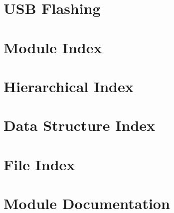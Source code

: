 \documentclass[twoside]{book}
\newcommand{\+}{\discretionary{\mbox{\scriptsize$\hookleftarrow$}}{}{}}
\begin{document}
\chapter{U\+S\+B Flashing}
\label{md_docs_USB_Flashing}
\hypertarget{md_docs_USB_Flashing}{}

\chapter{Module Index}

\chapter{Hierarchical Index}

\chapter{Data Structure Index}

\chapter{File Index}

\chapter{Module Documentation}



















\end{document}
